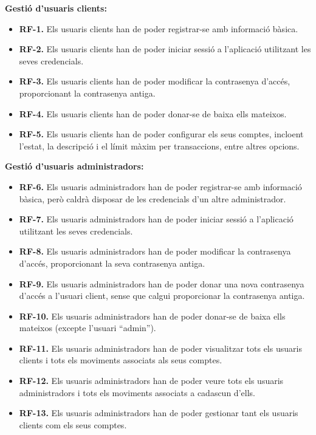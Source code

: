 \documentclass[a4paper,12pt,twoside]{ThesisStyle}
\begin{document}
\textbf{Gestió d'usuaris clients:}
\begin{itemize}
    \item \textbf{RF-1.} Els usuaris clients han de poder registrar-se amb informació bàsica.
    \item \textbf{RF-2.} Els usuaris clients han de poder iniciar sessió a l'aplicació utilitzant les seves credencials.
    \item \textbf{RF-3.} Els usuaris clients han de poder modificar la contrasenya d'accés, proporcionant la contrasenya antiga.
    \item \textbf{RF-4.} Els usuaris clients han de poder donar-se de baixa ells mateixos.
    \item \textbf{RF-5.} Els usuaris clients han de poder configurar els seus comptes, incloent l'estat, la descripció i el límit màxim per transaccions, entre altres opcions.
\end{itemize}


\textbf{Gestió d'usuaris administradors:}
\begin{itemize}
    \item \textbf{RF-6.} Els usuaris administradors han de poder registrar-se amb informació bàsica, però caldrà disposar de les credencials d'un altre administrador.
    \item \textbf{RF-7.} Els usuaris administradors han de poder iniciar sessió a l'aplicació utilitzant les seves credencials.
    \item \textbf{RF-8.} Els usuaris administradors han de poder modificar la contrasenya d'accés, proporcionant la seva contrasenya antiga.
    \item \textbf{RF-9.} Els usuaris administradors han de poder donar una nova contrasenya d'accés a l'usuari client, sense que calgui proporcionar la contrasenya antiga.
    \item \textbf{RF-10.} Els usuaris administradors han de poder donar-se de baixa ells mateixos (excepte l'usuari ``admin'').
    \item \textbf{RF-11.} Els usuaris administradors han de poder visualitzar tots els usuaris clients i tots els moviments associats als seus comptes.
    \item \textbf{RF-12.} Els usuaris administradors han de poder veure tots els usuaris administradors i tots els moviments associats a cadascun d'ells.
    \item \textbf{RF-13.} Els usuaris administradors han de poder gestionar tant els usuaris clients com els seus comptes.
\end{itemize}
\end{document}
